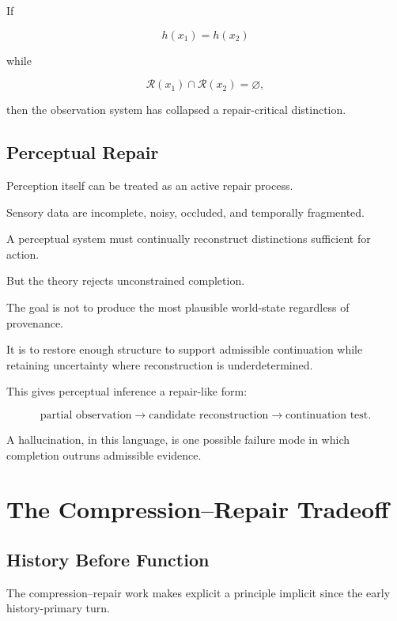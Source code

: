 \documentclass[11pt]{article}
\theoremstyle{remark}
\begin{document}
If

\begin{equation}
h(x_1)=h(x_2)
\end{equation}

while

\begin{equation}
\mathcal{R}(x_1)\cap\mathcal{R}(x_2)=\varnothing,
\end{equation}

then the observation system has collapsed a repair-critical distinction.

\subsection{Perceptual Repair}

Perception itself can be treated as an active repair process.

Sensory data are incomplete, noisy, occluded, and temporally fragmented.

A perceptual system must continually reconstruct distinctions sufficient for action.

But the theory rejects unconstrained completion.

The goal is not to produce the most plausible world-state regardless of provenance.

It is to restore enough structure to support admissible continuation while retaining uncertainty where reconstruction is underdetermined.

This gives perceptual inference a repair-like form:

\begin{equation}
\text{partial observation}
\rightarrow
\text{candidate reconstruction}
\rightarrow
\text{continuation test}.
\end{equation}

A hallucination, in this language, is one possible failure mode in which completion outruns admissible evidence.

\section{The Compression--Repair Tradeoff}

\subsection{History Before Function}

The compression--repair work makes explicit a principle implicit since the early history-primary turn.
\end{document}
